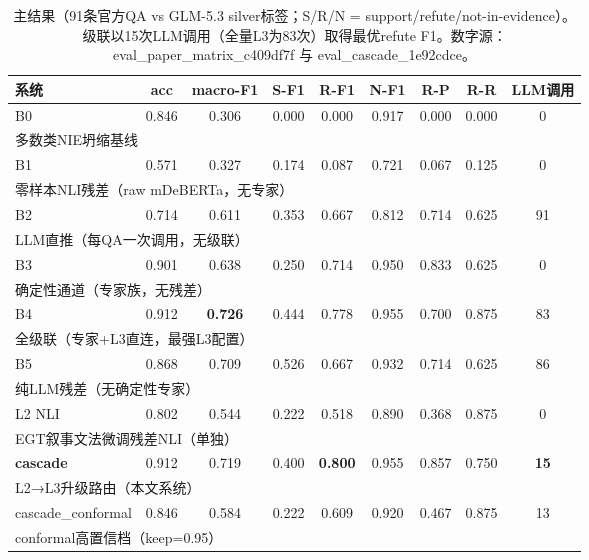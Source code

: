 \begin{table}[t]
\centering
\small
\caption{主结果（91条官方QA vs GLM-5.3 silver标签；S/R/N = support/refute/not-in-evidence）。级联以15次LLM调用（全量L3为83次）取得最优refute F1。数字源：eval\_paper\_matrix\_c409df7f 与 eval\_cascade\_1e92cdce。}
\label{tab:main}
\begin{tabular}{lcccccccc}
\toprule
系统 & acc & macro-F1 & S-F1 & R-F1 & N-F1 & R-P & R-R & LLM调用 \\
\midrule
B0 & 0.846 & 0.306 & 0.000 & 0.000 & 0.917 & 0.000 & 0.000 & 0 \\
\multicolumn{9}{l}{\scriptsize 多数类NIE坍缩基线} \\
B1 & 0.571 & 0.327 & 0.174 & 0.087 & 0.721 & 0.067 & 0.125 & 0 \\
\multicolumn{9}{l}{\scriptsize 零样本NLI残差（raw mDeBERTa，无专家）} \\
B2 & 0.714 & 0.611 & 0.353 & 0.667 & 0.812 & 0.714 & 0.625 & 91 \\
\multicolumn{9}{l}{\scriptsize LLM直推（每QA一次调用，无级联）} \\
B3 & 0.901 & 0.638 & 0.250 & 0.714 & 0.950 & 0.833 & 0.625 & 0 \\
\multicolumn{9}{l}{\scriptsize 确定性通道（专家族，无残差）} \\
B4 & 0.912 & \textbf{0.726} & 0.444 & 0.778 & 0.955 & 0.700 & 0.875 & 83 \\
\multicolumn{9}{l}{\scriptsize 全级联（专家+L3直连，最强L3配置）} \\
B5 & 0.868 & 0.709 & 0.526 & 0.667 & 0.932 & 0.714 & 0.625 & 86 \\
\multicolumn{9}{l}{\scriptsize 纯LLM残差（无确定性专家）} \\
L2 NLI & 0.802 & 0.544 & 0.222 & 0.518 & 0.890 & 0.368 & 0.875 & 0 \\
\multicolumn{9}{l}{\scriptsize EGT叙事文法微调残差NLI（单独）} \\
\textbf{cascade} & 0.912 & 0.719 & 0.400 & \textbf{0.800} & 0.955 & 0.857 & 0.750 & \textbf{15} \\
\multicolumn{9}{l}{\scriptsize L2→L3升级路由（本文系统）} \\
cascade\_conformal & 0.846 & 0.584 & 0.222 & 0.609 & 0.920 & 0.467 & 0.875 & 13 \\
\multicolumn{9}{l}{\scriptsize conformal高置信档（keep=0.95）} \\
\bottomrule
\end{tabular}
\end{table}

